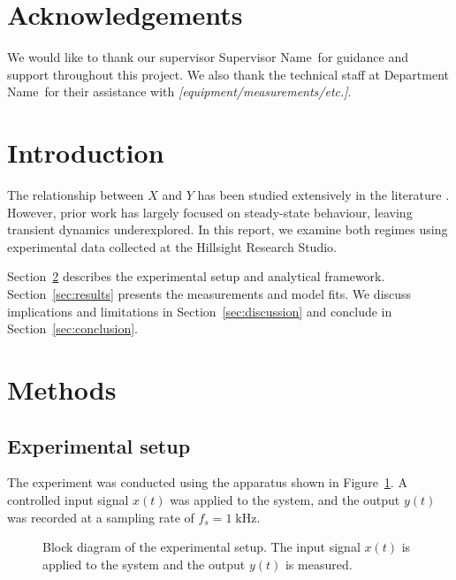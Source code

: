 \documentclass[12pt,a4paper]{article}
\newcommand{\supervisor}{Supervisor Name}
\newcommand{\department}{Department Name}
\begin{document}
\newpage

\section*{Acknowledgements}

We would like to thank our supervisor \supervisor\ for guidance and
support throughout this project. We also thank the technical staff at
\department\ for their assistance with \textit{[equipment/measurements/etc.]}.

\newpage

\tableofcontents
\newpage

\section{Introduction}

The relationship between $X$ and $Y$ has been studied extensively in
the literature \cite{smith2023, jones2024}. However, prior work has
largely focused on steady-state behaviour, leaving transient dynamics
underexplored. In this report, we examine both regimes using
experimental data collected at the Hillsight Research Studio.

Section~\ref{sec:methods} describes the experimental setup and
analytical framework. Section~\ref{sec:results} presents the
measurements and model fits. We discuss implications and limitations
in Section~\ref{sec:discussion} and conclude in
Section~\ref{sec:conclusion}.


\section{Methods}
\label{sec:methods}

\subsection{Experimental setup}

The experiment was conducted using the apparatus shown in
Figure~\ref{fig:setup}. A controlled input signal $x(t)$ was applied
to the system, and the output $y(t)$ was recorded at a sampling rate
of $f_s = 1\;\text{kHz}$.

\begin{figure}[H]
  \centering
  \caption{Block diagram of the experimental setup. The input signal
    $x(t)$ is applied to the system and the output $y(t)$ is measured.}
  \label{fig:setup}
\end{figure}
\end{document}
